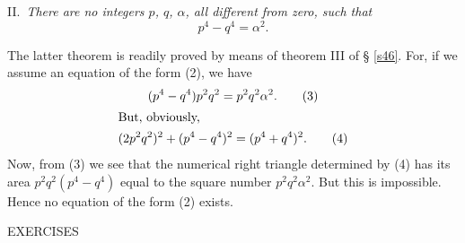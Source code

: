\documentclass[oneside]{book}
\begin{document}
\smallskip II.~\emph{There are no integers $p$, $q$, $\alpha$, all
different from zero, such that}
\begin{equation}
p^4 - q^4 = \alpha^2. \tag{2}
\end{equation}

The latter theorem is readily proved by means of theorem III of \S
\ref{s46}. For, if we assume an equation of the form (2), we have
\begin{gather}
(p^4 - q^4)p^2 q^2 = p^2 q^2 \alpha^2. \tag{3} \\
\intertext{But, obviously,}
(2p^2 q^2)^2 + (p^4 - q^4)^2 = (p^4 + q^4)^2. \tag{4}
\end{gather}
Now, from (3) we see that the numerical right triangle determined by
(4) has its area $p^2 q^2(p^4 - q^4)$ equal to the square number
$p^2 q^2 \alpha^2$. But this is impossible. Hence no equation of the
form (2) exists.

\begin{center}
EXERCISES
\end{center}
\end{document}
